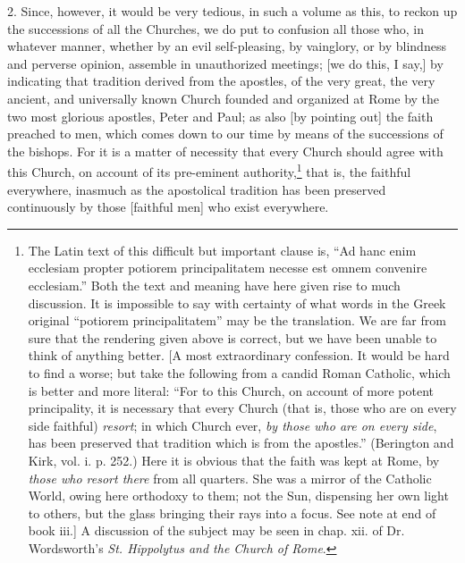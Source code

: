 2. Since, however, it would be very tedious, in such a volume as this, to reckon up the successions of all the Churches, we do put to confusion all those who, in whatever manner, whether by an evil self-pleasing, by vainglory, or by blindness and perverse opinion, assemble in unauthorized meetings; [we do this, I say,] by indicating that tradition derived from the apostles, of the very great, the very ancient, and universally known Church founded and organized at Rome by the two most glorious apostles, Peter and Paul; as also [by pointing out] the faith preached to men, which comes down to our time by means of the successions of the bishops. For it is a matter of necessity that every Church should agree with this Church, on account of its pre-eminent authority,\footnote{The Latin text of this difficult but important clause is, “Ad hanc enim ecclesiam propter potiorem principalitatem necesse est omnem convenire ecclesiam.” Both the text and meaning have here given rise to much discussion. It is impossible to say with certainty of what words in the Greek original “potiorem principalitatem” may be the translation. We are far from sure that the rendering given above is correct, but we have been unable to think of anything better. [A most extraordinary confession. It would be hard to find a worse; but take the following from a candid Roman Catholic, which is better and more literal: “For to this Church, on account of more potent principality, it is necessary that every Church (that is, those who are on every side faithful) \emph{resort}; in which Church ever, \emph{by those who are on every side}, has been preserved that tradition which is from the apostles.” (Berington and Kirk, vol. i. p. 252.) Here it is obvious that the faith was kept at Rome, by \emph{those who resort there} from all quarters. She was a mirror of the Catholic World, owing here orthodoxy to them; not the Sun, dispensing her own light to others, but the glass bringing their rays into a focus. See note at end of book iii.] A discussion of the subject may be seen in chap. xii. of Dr. Wordsworth’s \emph{St. Hippolytus and the Church of Rome}.} that is, the faithful everywhere,  inasmuch as the apostolical tradition has been preserved continuously by those [faithful men] who exist everywhere.

